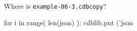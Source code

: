 \documentclass[12pt]{cdblatex}
\begin{document}
%
{}%
{Where is {\tt example-06-3.cdbcopy}?}

\clearpage


\bgroup
{}
\begin{cadabra}
   for i in range( len(json) ):
      cdblib.put ('json%
\end{cadabra}
\egroup
\end{document}
